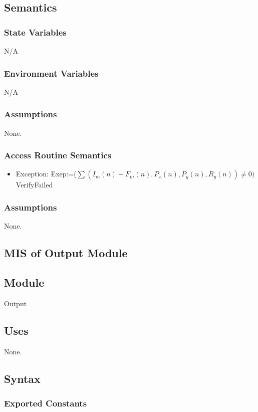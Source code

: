 \documentclass[12pt, titlepage]{article}
\begin{document}
\subsection{Semantics}
\subsubsection{State Variables}
N/A

\subsubsection{Environment Variables}
N/A

\subsubsection{Assumptions}
None.
\subsubsection{Access Routine Semantics}
\begin{itemize}
    \item Exception: Exep:=($\sum { (I_m(n) + F_m(n), P_x(n),P_y(n),R_y(n))} \neq 0)$ \Rightarrow VerifyFailed
\end{itemize}
\subsubsection{Assumptions}
None.

\subsection{MIS of Output Module \label{mSpec} }

\subsection{Module}

Output

\subsection{Uses}
None.

\subsection{Syntax}

\subsubsection{Exported Constants}
\end{document}
